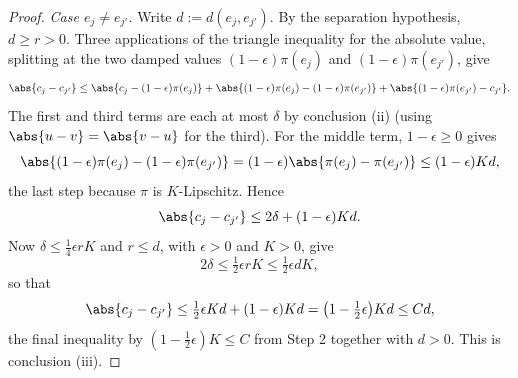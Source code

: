 \begin{proof}
  \emph{Case $e_j \ne e_{j'}$.} Write $d := d(e_j,e_{j'})$. By the separation hypothesis, $d \ge r >
  0$. Three applications of the triangle inequality for the absolute value, splitting at the two
  damped values $(1-\epsilon)\pi(e_j)$ and $(1-\epsilon)\pi(e_{j'})$, give
  \[
    \abs{c_j - c_{j'}}
      \le \abs{c_j - (1-\epsilon)\pi(e_j)}
        + \abs{(1-\epsilon)\pi(e_j) - (1-\epsilon)\pi(e_{j'})}
        + \abs{(1-\epsilon)\pi(e_{j'}) - c_{j'}}
    .
  \]
  The first and third terms are each at most $\delta$ by conclusion (ii) (using
  $\abs{u - v} = \abs{v - u}$ for the third). For the middle term, $1 - \epsilon \ge 0$ gives
  \[
    \abs{(1-\epsilon)\pi(e_j) - (1-\epsilon)\pi(e_{j'})}
      = (1-\epsilon)\abs{\pi(e_j)-\pi(e_{j'})}
      \le (1-\epsilon) K d
    ,
  \]
  the last step because $\pi$ is $K$-Lipschitz. Hence
  \[
    \abs{c_j - c_{j'}} \le 2\delta + (1-\epsilon)Kd
    .
  \]
  Now $\delta \le \tfrac14 \epsilon r K$ and $r \le d$, with $\epsilon > 0$ and $K > 0$, give
  \[
    2\delta \le \tfrac12 \epsilon r K \le \tfrac12 \epsilon d K
    ,
  \]
  so that
  \[
    \abs{c_j - c_{j'}}
      \le \tfrac12\epsilon K d + (1-\epsilon)Kd
      = \bigl(1 - \tfrac12\epsilon\bigr) K d
      \le C d
    ,
  \]
  the final inequality by $(1-\tfrac12\epsilon)K \le C$ from Step 2 together with $d > 0$. This is
  conclusion (iii).
\end{proof}
